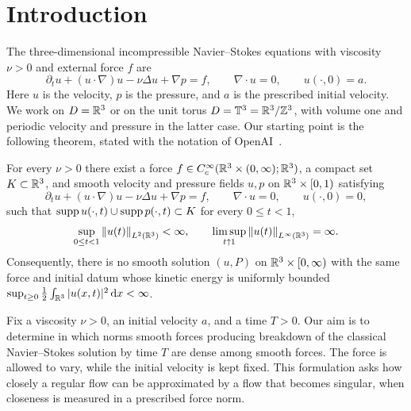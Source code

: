 \section{Introduction}\label{sec:intro}
The three-dimensional incompressible Navier--Stokes equations with
viscosity $\nu>0$ and external force $f$ are
\begin{equation}\label{eq:NS}
 \partial_tu+(u\cdot\nabla)u-\nu\Delta u+\nabla p=f,
 \qquad \nabla\cdot u=0,\qquad u(\cdot,0)=a.
\end{equation}
Here $u$ is the velocity, $p$ is the pressure, and $a$ is the prescribed
initial velocity. We work on $D=\mathbb R^3$ or on the unit torus
$D=\mathbb T^3=\mathbb R^3/\mathbb Z^3$, with volume one and periodic velocity and
pressure in the latter case. Our starting point is the following theorem, stated with
the notation of OpenAI~\cite[Theorem~1.1]{openai}.

\begin{theorem}[OpenAI]\label{thm:packet}
For every $\nu>0$ there exist a force
$f\in C_c^\infty(\mathbb R^3\times(0,\infty);\mathbb R^3)$, a compact set
$K\subset\mathbb R^3$, and smooth velocity and pressure fields $u,p$ on
$\mathbb R^3\times[0,1)$ satisfying
\begin{equation}\label{eq:packet}
 \partial_tu+(u\cdot\nabla)u-\nu\Delta u+\nabla p=f,
 \qquad \nabla\cdot u=0,\qquad u(\cdot,0)=0,
\end{equation}
such that $\operatorname{supp} u(\cdot,t)\cup\operatorname{supp} p(\cdot,t)\subset K$ for every
$0\le t<1$,
\begin{equation}\label{eq:packetblowup}
 \sup_{0\le t<1}\left\lVert u(t)\right\rVert_{L^2(\mathbb R^3)}<\infty,
 \qquad \limsup_{t\uparrow1}\left\lVert u(t)\right\rVert_{L^\infty(\mathbb R^3)}=\infty.
\end{equation}
Consequently, there is no smooth solution $(u,P)$ on
$\mathbb R^3\times[0,\infty)$ with the same force and initial datum whose
kinetic energy is uniformly bounded
$\sup_{t\ge0}\frac12\int_{\mathbb R^3}|u(x,t)|^2\,\mathrm d x<\infty$.
\end{theorem}

Fix a viscosity $\nu>0$, an initial velocity $a$, and a time $T>0$.
Our aim is to determine in which norms smooth forces producing breakdown
of the classical Navier--Stokes solution by time $T$ are dense among smooth
forces. The force is allowed to vary, while the initial velocity is kept
fixed. This formulation asks how closely a regular flow can be approximated
by a flow that becomes singular, when closeness is measured in a prescribed
force norm.

